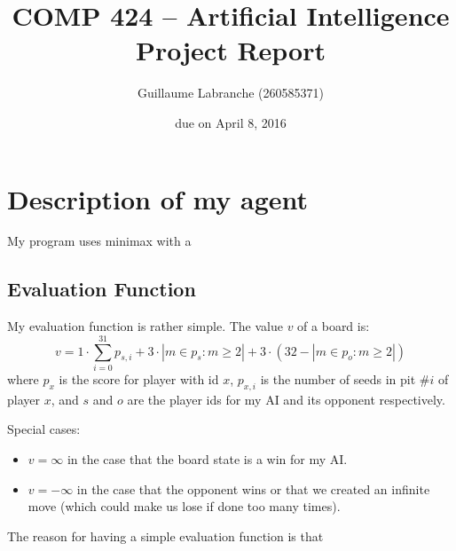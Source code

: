 \documentclass{article}
\author{Guillaume Labranche (260585371)}
\title{COMP 424 -- Artificial Intelligence\\Project Report}
\date{due on April 8, 2016}
\begin{document}
\maketitle

\section{Description of my agent}

My program uses minimax with a 

\subsection{Evaluation Function}
My evaluation function is rather simple. The value $v$ of a board is:
$$v = 1 \cdot \sum_{i=0}^{31} p_{s,i} + 3 \cdot | m \in p_s : m \geq 2 | + 3 \cdot (32-| m \in p_o : m \geq 2 |)
$$
where $p_x$ is the score for player with id $x$, $p_{x,i}$ is the number of seeds in pit \#$i$ of player $x$, and $s$ and $o$ are the player ids for my AI and its opponent respectively.

Special cases:\begin{itemize}
\item $v=\infty$ in the case that the board state is a win for my AI.
\item $v=-\infty$ in the case that the opponent wins or that we created an infinite move (which could make us lose if done too many times).
\end{itemize}

The reason for having a simple evaluation function is that 
\end{document}
